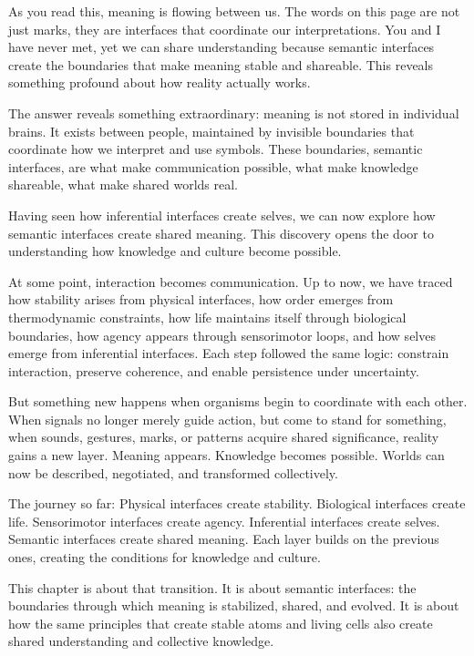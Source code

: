 \documentclass[
  openright]{book}
\begin{document}
As you read this, meaning is flowing between us. The words on this page
are not just marks, they are interfaces that coordinate our
interpretations. You and I have never met, yet we can share
understanding because semantic interfaces create the boundaries that
make meaning stable and shareable. This reveals something profound about
how reality actually works.

The answer reveals something extraordinary: meaning is not stored in
individual brains. It exists between people, maintained by invisible
boundaries that coordinate how we interpret and use symbols. These
boundaries, semantic interfaces, are what make communication possible,
what make knowledge shareable, what make shared worlds real.

Having seen how inferential interfaces create selves, we can now explore
how semantic interfaces create shared meaning. This discovery opens the
door to understanding how knowledge and culture become possible.

At some point, interaction becomes communication. Up to now, we have
traced how stability arises from physical interfaces, how order emerges
from thermodynamic constraints, how life maintains itself through
biological boundaries, how agency appears through sensorimotor loops,
and how selves emerge from inferential interfaces. Each step followed
the same logic: constrain interaction, preserve coherence, and enable
persistence under uncertainty.

But something new happens when organisms begin to coordinate with each
other. When signals no longer merely guide action, but come to stand for
something, when sounds, gestures, marks, or patterns acquire shared
significance, reality gains a new layer. Meaning appears. Knowledge
becomes possible. Worlds can now be described, negotiated, and
transformed collectively.

The journey so far: Physical interfaces create stability. Biological
interfaces create life. Sensorimotor interfaces create agency.
Inferential interfaces create selves. Semantic interfaces create shared
meaning. Each layer builds on the previous ones, creating the conditions
for knowledge and culture.

This chapter is about that transition. It is about semantic interfaces:
the boundaries through which meaning is stabilized, shared, and evolved.
It is about how the same principles that create stable atoms and living
cells also create shared understanding and collective knowledge.
\end{document}

